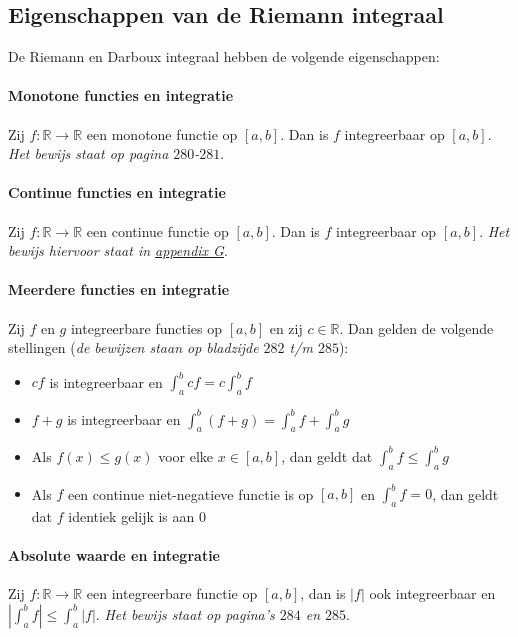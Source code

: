 \subsection{Eigenschappen van de Riemann integraal}
De Riemann en Darboux integraal hebben de volgende eigenschappen:

\paragraph{Monotone functies en integratie} Zij $f:\mathbb{R}\to\mathbb{R}$ een monotone functie op $[a,b]$. Dan is $f$ integreerbaar op $[a,b]$. \textit{Het bewijs staat op pagina $280$-$281$}.

\paragraph{Continue functies en integratie} Zij $f:\mathbb{R}\to\mathbb{R}$ een continue functie op $[a,b]$. Dan is $f$ integreerbaar op $[a,b]$. \textit{Het bewijs hiervoor staat in \hyperref[sec:AG]{appendix G}}.

\paragraph{Meerdere functies en integratie} Zij $f$ en $g$ integreerbare functies op $[a,b]$ en zij $c\in\mathbb{R}$. Dan gelden de volgende stellingen (\textit{de bewijzen staan op bladzijde $282$ t/m $285$}):

\begin{itemize}
  \setlength\itemsep{0em}
  \item $cf$ is integreerbaar en $\int_{a}^{b}cf=c\int_{a}^{b}f$
  \item $f+g$ is integreerbaar en $\int_{a}^{b}(f+g)=\int_{a}^{b}f+\int_{a}^{b}g$
  \item Als $f(x)\leq g(x)$ voor elke $x\in[a,b]$, dan geldt dat $\int_{a}^{b}f\leq\int_{a}^{b}g$
  \item Als $f$ een continue niet-negatieve functie is op $[a,b]$ en $\int_{a}^{b}f=0$, dan geldt dat $f$ identiek gelijk is aan $0$
\end{itemize}

\paragraph{Absolute waarde en integratie} Zij $f:\mathbb{R}\to\mathbb{R}$ een integreerbare functie op $[a,b]$, dan is $|f|$ ook integreerbaar en $|\int_{a}^{b}f|\leq\int_{a}^{b}|f|$. \textit{Het bewijs staat op pagina's $284$ en $285$}.

